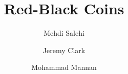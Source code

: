 \documentclass[envcountsect]{llncs}
\begin{document}
\frontmatter
\mainmatter

\title{\Large \bf Red-Black Coins}

\author{Mehdi Salehi \and Jeremy Clark \and Mohammad Mannan}

\maketitle







%
%






\clearpage
\appendix

%

\end{document}
